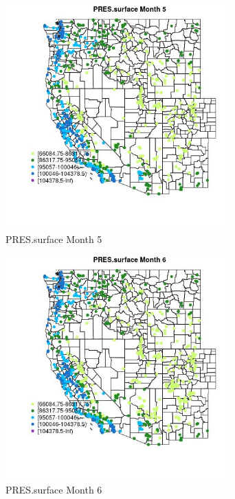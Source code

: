 \begin{figure} 
\centering  
\includegraphics[width=0.77\textwidth]{Code_Outputs/Report_ML_input_PM25_Step4_part_f_de_duplicated_aves_prioritize_24hr_obswNAs_MapObsMo5PRESsurface.jpg} 
\caption{\label{fig:Report_ML_input_PM25_Step4_part_f_de_duplicated_aves_prioritize_24hr_obswNAsMapObsMo5PRESsurface}PRES.surface Month 5} 
\end{figure} 
 

\begin{figure} 
\centering  
\includegraphics[width=0.77\textwidth]{Code_Outputs/Report_ML_input_PM25_Step4_part_f_de_duplicated_aves_prioritize_24hr_obswNAs_MapObsMo6PRESsurface.jpg} 
\caption{\label{fig:Report_ML_input_PM25_Step4_part_f_de_duplicated_aves_prioritize_24hr_obswNAsMapObsMo6PRESsurface}PRES.surface Month 6} 
\end{figure} 
 

